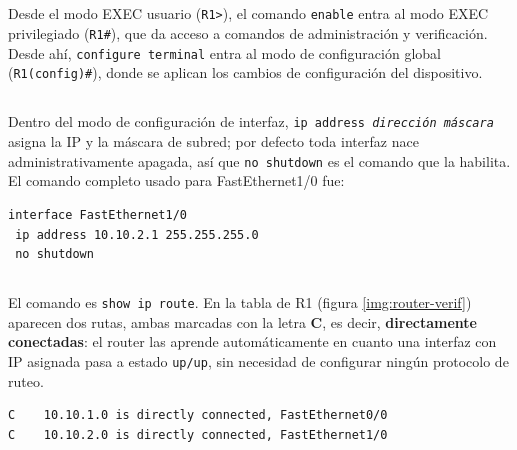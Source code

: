 \documentclass[10pt,a4paper]{article}
\begin{document}
\subsection*{\color{colorESCOM}{1. ¿Cuáles son los comandos para entrar al modo EXEC privilegiado y al modo de configuración global?}}

Desde el modo EXEC usuario (\texttt{R1>}), el comando \texttt{enable} entra al modo EXEC privilegiado (\texttt{R1\#}), que da acceso a comandos de administración y verificación. Desde ahí, \texttt{configure terminal} entra al modo de configuración global (\texttt{R1(config)\#}), donde se aplican los cambios de configuración del dispositivo.

\subsection*{\color{colorESCOM}{2. ¿Cuáles son los comandos para asignar una IP a una interfaz y habilitarla? ¿Cuál es el comando completo para FastEthernet 1/0?}}

Dentro del modo de configuración de interfaz, \texttt{ip address \textit{dirección máscara}} asigna la IP y la máscara de subred; por defecto toda interfaz nace administrativamente apagada, así que \texttt{no shutdown} es el comando que la habilita. El comando completo usado para FastEthernet1/0 fue:

\begin{lstlisting}[language=bash]
interface FastEthernet1/0
 ip address 10.10.2.1 255.255.255.0
 no shutdown
\end{lstlisting}

\subsection*{\color{colorESCOM}{3. ¿Cuál es el comando para ver la tabla de ruteo, y de qué tipo son esas rutas?}}

El comando es \texttt{show ip route}. En la tabla de R1 (figura \ref{img:router-verif}) aparecen dos rutas, ambas marcadas con la letra \textbf{C}, es decir, \textbf{directamente conectadas}: el router las aprende automáticamente en cuanto una interfaz con IP asignada pasa a estado \texttt{up/up}, sin necesidad de configurar ningún protocolo de ruteo.

\begin{lstlisting}[language=bash]
C    10.10.1.0 is directly connected, FastEthernet0/0
C    10.10.2.0 is directly connected, FastEthernet1/0
\end{lstlisting}
\end{document}
